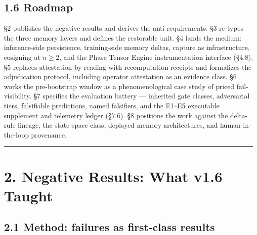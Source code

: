 \documentclass[11pt]{article}
\begin{document}
\subsection{1.6 Roadmap}\label{roadmap}

\S{}2 publishes the negative results and derives the anti-requirements. \S{}3 re-types the three memory layers and defines the restorable unit. \S{}4 lands the medium: inference-side persistence, training-side memory deltas, capture as infrastructure, cosigning at \(n\geq 2\), and the Phase Tensor Engine instrumentation interface (\S{}4.8). \S{}5 replaces attestation-by-reading with recomputation receipts and formalizes the adjudication protocol, including operator attestation as an evidence class. \S{}6 works the pre-bootstrap window as a phenomenological case study of priced fail-visibility. \S{}7 specifies the evaluation battery --- inherited gate classes, adversarial tiers, falsifiable predictions, named falsifiers, and the E1--E5 executable supplement and telemetry ledger (\S{}7.6). \S{}8 positions the work against the delta-rule lineage, the state-space class, deployed memory architectures, and human-in-the-loop provenance.

\begin{center}\rule{0.5\linewidth}{0.5pt}\end{center}

\section{2. Negative Results: What v1.6 Taught}\label{negative-results-what-v1.6-taught}

\subsection{2.1 Method: failures as first-class results}\label{method-failures-as-first-class-results}
\end{document}
